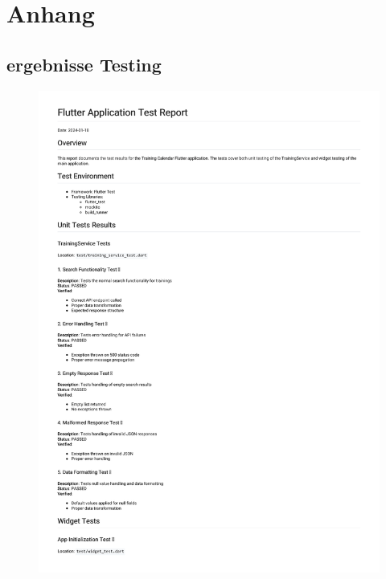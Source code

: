 \chapter{Anhang}
\label{Anhang}

\section{ergebnisse Testing}


\begin{figure}[htbp!]
    \centering
    \includegraphics[scale=0.7]{img/Markdown to PDF.pdf}
    \label{TEstprotokoll Flutter}
\end{figure}



